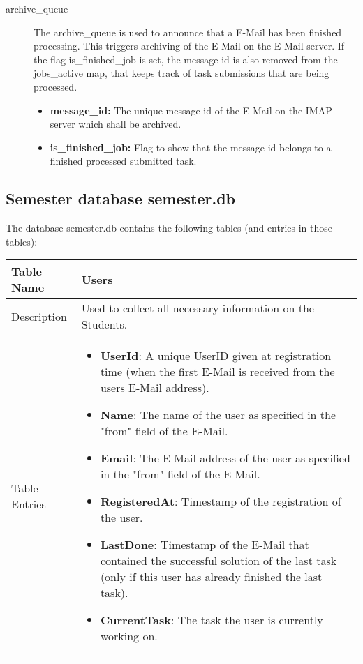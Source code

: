 \begin{description}
\item [archive\_queue] The archive\_queue is used to announce that a E-Mail has
	been finished processing. This triggers archiving of the E-Mail on the
	E-Mail server. If the flag is\_finished\_job is set, the message-id is also
	removed from the jobs\_active map, that keeps track of task submissions
	that are being processed.
	\begin{itemize}
		\item {\bf message\_id:} The unique message-id of the E-Mail on the IMAP
			server which shall be archived.
		\item {\bf is\_finished\_job:} Flag to show that the message-id belongs
			to a finished processed submitted task.
	\end{itemize}
\end{description}

\newpage

\subsection{Semester database semester.db} \label{app:semester.db}

The database semester.db contains the following tables (and entries in those tables):

\begin{tabular}{|p{3cm}|p{10cm}|}
\hline
Table Name & Users \\
\hline
Description & Used to collect all necessary information on the Students.\\
\hline
Table Entries & \begin{itemize}
        \item {\bf UserId}: A unique UserID given at registration time (when the first E-Mail
            is received from the users E-Mail address).
        \item {\bf Name}: The name of the user as specified in the "from" field of the E-Mail.
        \item {\bf Email}: The E-Mail address of the user as specified in the "from" field of the
            E-Mail.
        \item {\bf RegisteredAt}: Timestamp of the registration of the user.
        \item {\bf LastDone}: Timestamp of the E-Mail that contained the successful solution of the
            last task (only if this user has already finished the last task).
        \item {\bf CurrentTask}: The task the user is currently working on.
        \end{itemize} \\
\hline
\end{tabular}

